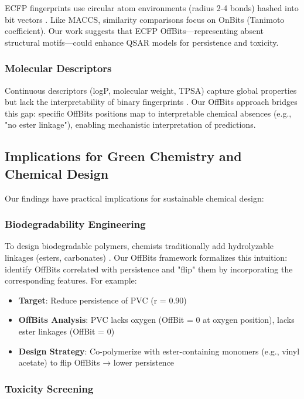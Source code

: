 \documentclass[11pt,letterpaper]{article}
\begin{document}
ECFP fingerprints use circular atom environments (radius 2-4 bonds) hashed into bit vectors \cite{Rogers2010}. Like MACCS, similarity comparisons focus on OnBits (Tanimoto coefficient). Our work suggests that ECFP OffBits—representing absent structural motifs—could enhance QSAR models for persistence and toxicity.

\subsubsection{Molecular Descriptors}

Continuous descriptors (logP, molecular weight, TPSA) capture global properties but lack the interpretability of binary fingerprints \cite{todeschini2008molecular}. Our OffBits approach bridges this gap: specific OffBits positions map to interpretable chemical absences (e.g., "no ester linkage"), enabling mechanistic interpretation of predictions.

\subsection{Implications for Green Chemistry and Chemical Design}

Our findings have practical implications for sustainable chemical design:

\subsubsection{Biodegradability Engineering}

To design biodegradable polymers, chemists traditionally add hydrolyzable linkages (esters, carbonates) \cite{nair2007biodegradable}. Our OffBits framework formalizes this intuition: identify OffBits correlated with persistence and "flip" them by incorporating the corresponding features. For example:

\begin{itemize}
    \item \textbf{Target}: Reduce persistence of PVC (r = 0.90)
    \item \textbf{OffBits Analysis}: PVC lacks oxygen (OffBit = 0 at oxygen position), lacks ester linkages (OffBit = 0)
    \item \textbf{Design Strategy}: Co-polymerize with ester-containing monomers (e.g., vinyl acetate) to flip OffBits → lower persistence
\end{itemize}

\subsubsection{Toxicity Screening}
\end{document}
